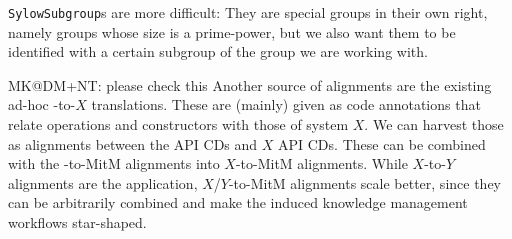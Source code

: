 \texttt{SylowSubgroup}s are more difficult: They are special groups in their
own right, namely groups whose size is a prime-power, but we also want them
to be identified with a certain subgroup of the group we are working
with.

\begin{newpart}{MK@DM+NT: please check this }
  Another source of alignments are the existing ad-hoc \Sage-to-$X$ translations. These
  are (mainly) given as \Sage code annotations that relate \Sage operations and
  constructors with those of system $X$. We can harvest those as alignments between
  the \Sage API CDs and $X$ API CDs. These can be combined with the \Sage-to-MitM
  alignments into $X$-to-MitM alignments. While $X$-to-$Y$ alignments are the application,
  $X$/$Y$-to-MitM alignments scale better, since they can be arbitrarily combined and make
  the induced knowledge management workflows star-shaped.
\end{newpart}

